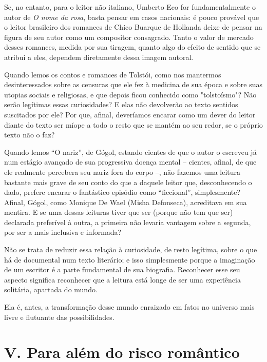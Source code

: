 Se, no entanto, para o leitor não italiano, Umberto Eco for
fundamentalmente o autor de \emph{O nome da rosa}, basta pensar em casos
nacionais: é pouco provável que o leitor brasileiro dos romances de
Chico Buarque de Hollanda deixe de pensar na figura de seu autor como um
compositor consagrado. Tanto o valor de mercado desses romances, medida
por sua tiragem, quanto algo do efeito de sentido que se atribui a eles,
dependem diretamente dessa imagem autoral.

Quando lemos os contos e romances de Tolstói, como nos mantermos
desinteressados sobre as censuras que ele fez à medicina de sua época e
sobre suas utopias sociais e religiosas, e que depois ficou conhecido
como "tolstoísmo"? Não serão legítimas essas curiosidades? E elas não
devolverão ao texto sentidos suscitados por ele? Por que, afinal,
deveríamos encarar como um dever do leitor diante do texto ser míope a
todo o resto que se mantém ao seu redor, se o próprio texto não o faz?

Quando lemos ``O nariz'', de Gógol, estando cientes de que o autor o
escreveu já num estágio avançado de sua progressiva doença mental --
cientes, afinal, de que ele realmente percebera seu nariz fora do corpo
--, não fazemos uma leitura bastante mais grave de seu conto do que a
daquele leitor que, desconhecendo o dado, prefere encarar o fantástico
episódio como ``ficcional'', simplesmente? Afinal, Gógol, como Monique
De Wael (Misha Defonseca), acreditava em sua mentira. E se uma dessas
leituras tiver que ser (porque não tem que ser) declarada preferível à
outra, a primeira não levaria vantagem sobre a segunda, por ser a mais
inclusiva e informada?

Não se trata de reduzir essa relação à curiosidade, de resto legítima,
sobre o que há de documental num texto literário; e isso simplesmente
porque a imaginação de um escritor é a parte fundamental de sua
biografia. Reconhecer esse seu aspecto significa reconhecer que a
leitura está longe de ser uma experiência solitária, apartada do mundo.

Ela é, antes, a transformação desse mundo enraizado em fatos no universo
mais livre e flutuante das possibilidades.

\section*{V. Para além do risco romântico}

